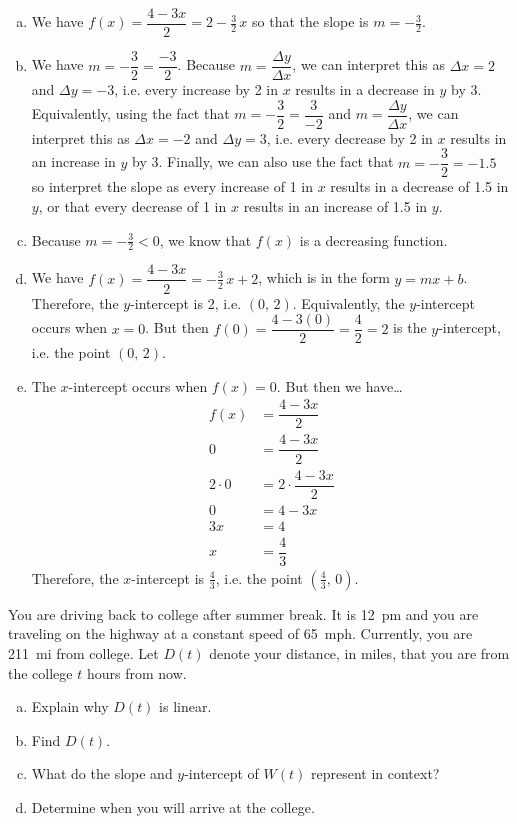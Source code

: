 \documentclass[11pt,letterpaper]{article}
\begin{document}
\sol
\begin{enumerate}[(a)]
\item We have $f(x)= \dfrac{4 - 3x}{2}= 2 - \frac{3}{2}\,x$ so that the slope is $m= -\frac{3}{2}$. 

\item We have $m= -\dfrac{3}{2}= \dfrac{-3}{2}$. Because $m= \dfrac{\Delta y}{\Delta x}$, we can interpret this as $\Delta x= 2$ and $\Delta y= -3$, i.e. every increase by 2 in $x$ results in a decrease in $y$ by 3. Equivalently, using the fact that $m= -\dfrac{3}{2}= \dfrac{3}{-2}$ and $m= \dfrac{\Delta y}{\Delta x}$, we can interpret this as $\Delta x= -2$ and $\Delta y= 3$, i.e. every decrease by 2 in $x$ results in an increase in $y$ by 3. Finally, we can also use the fact that $m= -\dfrac{3}{2}= -1.5$ so interpret the slope as every increase of 1 in $x$ results in a decrease of 1.5 in $y$, or that every decrease of 1 in $x$ results in an increase of 1.5 in $y$. 

\item Because $m= -\frac{3}{2} < 0$, we know that $f(x)$ is a decreasing function. 

\item We have $f(x)= \dfrac{4 - 3x}{2}= -\frac{3}{2}\,x + 2$, which is in the form $y= mx + b$. Therefore, the $y$-intercept is 2, i.e. $(0,\, 2)$. Equivalently, the $y$-intercept occurs when $x= 0$. But then $f(0)= \dfrac{4 - 3(0)}{2}= \dfrac{4}{2}= 2$ is the $y$-intercept, i.e. the point $(0,\, 2)$. 

\item The $x$-intercept occurs when $f(x)= 0$. But then we have\dots
	\[
	\begin{aligned}
	f(x)&= \dfrac{4 - 3x}{2} \\[0.3cm]
	0&= \dfrac{4 - 3x}{2} \\[0.3cm]
	2 \cdot 0&= 2 \cdot \dfrac{4 - 3x}{2} \\[0.3cm]
	0&= 4 - 3x \\[0.3cm]
	3x&= 4 \\[0.3cm]
	x&= \dfrac{4}{3}
	\end{aligned}
	\]
Therefore, the $x$-intercept is $\frac{4}{3}$, i.e. the point $(\frac{4}{3},\,  0)$. 
\end{enumerate} 



\newpage



 You are driving back to college after summer break. It is 12~pm and you are traveling on the highway at a constant speed of 65~mph. Currently, you are 211~mi from college. Let $D(t)$ denote your distance, in miles, that you are from the college $t$ hours from now. 
	\begin{enumerate}[(a)]
	\item Explain why $D(t)$ is linear.
	\item Find $D(t)$. 
	\item What do the slope and $y$-intercept of $W(t)$ represent in context?
	\item Determine when you will arrive at the college. 
	\end{enumerate} \pspace
\end{document}
